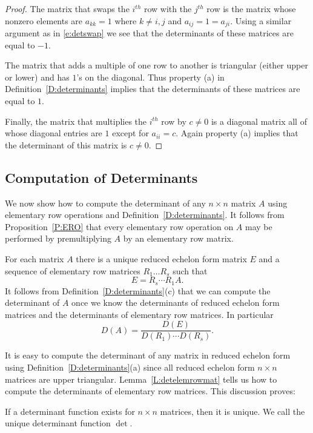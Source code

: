 \documentclass{ximera}
\begin{document}
\begin{proof} The matrix that swaps the $i^{th}$ row with the $j^{th}$
row is the matrix whose nonzero elements are $a_{kk}=1$ where
$k\neq i,j$ and $a_{ij}=1=a_{ji}$.  Using a similar argument as
in \eqref{e:detswap} we see that the determinants of these
matrices are equal to $-1$.
 
The matrix that adds a multiple of one row to another is
triangular (either upper or lower) and has $1$'s on the
diagonal.  Thus property (a) in Definition~\ref{D:determinants}
implies that the determinants of
these matrices are equal to $1$.
 
Finally, the matrix that multiplies the $i^{th}$ row by $c\neq
0$ is a diagonal matrix all of whose diagonal entries are $1$
except for $a_{ii}=c$.  Again property (a) implies that the
determinant of this matrix is $c\neq 0$. \end{proof}


\subsection*{Computation of Determinants}

We now show how to compute the determinant of any $n\times n$ matrix $A$ 
using elementary row operations and Definition~\ref{D:determinants}.  It 
follows from Proposition~\ref{P:ERO} that every elementary row operation 
on $A$ may be performed by premultiplying $A$ by an elementary row matrix. 

For each matrix $A$ there is a unique 
reduced echelon form matrix
$E$ and a sequence of elementary row matrices $R_1\ldots R_s$
such that 
\begin{equation}  \label{e:rowreduction}
E = R_s\cdots R_1A.
\end{equation}
It follows from Definition~\ref{D:determinants}(c) that we can
compute the determinant of $A$ once we know the determinants of
reduced echelon form matrices and the determinants of elementary
row matrices.  In particular
\begin{equation}  \label{e:detformula}
D(A) = \frac{D(E)}{D(R_1)\cdots D(R_s)}.
\end{equation}

It is easy to compute the determinant of any matrix in reduced echelon 
form using Definition~\ref{D:determinants}(a) since all reduced echelon 
form $n\times n$ matrices are upper triangular.  Lemma~\ref{L:detelemrowmat}  
tells us how to compute the determinants of elementary row matrices.  This 
discussion proves: 
\begin{proposition}
If a determinant function exists for $n\times n$ matrices, then it is unique. 
We call the unique determinant function $\det$. 
\end{proposition}
\end{document}
